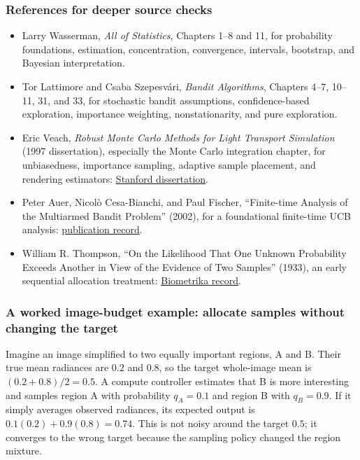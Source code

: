 \subsubsection{References for deeper source checks}\label{references-for-deeper-source-checks}

\begin{itemize}
\tightlist
\item
  Larry Wasserman, \emph{All of Statistics}, Chapters 1--8 and 11, for probability foundations, estimation, concentration, convergence, intervals, bootstrap, and Bayesian interpretation.
\item
  Tor Lattimore and Csaba Szepesvári, \emph{Bandit Algorithms}, Chapters 4--7, 10--11, 31, and 33, for stochastic bandit assumptions, confidence-based exploration, importance weighting, nonstationarity, and pure exploration.
\item
  Eric Veach, \emph{Robust Monte Carlo Methods for Light Transport Simulation} (1997 dissertation), especially the Monte Carlo integration chapter, for unbiasedness, importance sampling, adaptive sample placement, and rendering estimators: \href{https://graphics.stanford.edu/papers/veach_thesis/}{Stanford dissertation}.
\item
  Peter Auer, Nicolò Cesa-Bianchi, and Paul Fischer, ``Finite-time Analysis of the Multiarmed Bandit Problem'' (2002), for a foundational finite-time UCB analysis: \href{https://www2.compute.dtu.dk/pubdb/pubs/2088-full.html}{publication record}.
\item
  William R. Thompson, ``On the Likelihood That One Unknown Probability Exceeds Another in View of the Evidence of Two Samples'' (1933), an early sequential allocation treatment: \href{https://academic.oup.com/biomet/article-abstract/25/3-4/285/200862}{Biometrika record}.
\end{itemize}

\subsubsection{A worked image-budget example: allocate samples without changing the target}\label{a-worked-image-budget-example-allocate-samples-without-changing-the-target}

Imagine an image simplified to two equally important regions, A and B. Their true mean radiances are \(0.2\) and \(0.8\), so the target whole-image mean is \((0.2+0.8)/2=0.5\). A compute controller estimates that B is more interesting and samples region A with probability \(q_A=0.1\) and region B with \(q_B=0.9\). If it simply averages observed radiances, its expected output is \(0.1(0.2)+0.9(0.8)=0.74\). This is not noisy around the target \(0.5\); it converges to the wrong target because the sampling policy changed the region mixture.

